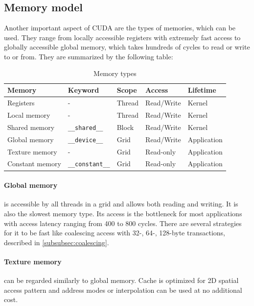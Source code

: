 \subsection{Memory model}\label{subsec:memory}

Another important aspect of CUDA are the types of memories, which can be used. They range from locally accessible registers with extremely fast access to globally accessible global memory, which takes hundreds of cycles to read or write to or from. They are summarized by the following table:

\begin{table}
\centering
\begin{tabular}{| l | l | l | l | l |}
\hline
Memory & Keyword & Scope & Access & Lifetime \\
\hline
Registers & - & Thread & Read/Write & Kernel \\
\hline
Local memory & - & Thread & Read/Write & Kernel \\
\hline
Shared memory & \verb|__shared__| & Block & Read/Write &  Kernel \\
\hline
Global memory & \verb|__device__| & Grid & Read/Write & Application \\
\hline
Texture memory & - & Grid & Read-only & Application \\
\hline
Constant memory & \verb|__constant__| & Grid & Read-only & Application \\
\hline
\end{tabular}
\caption{Memory types}
\end{table}

\paragraph{Global memory} is accessible by all threads in a grid and allows both reading and writing. It is also the slowest memory type. Its access is the bottleneck for most applications with access latency ranging from 400 to 800 cycles. There are several strategies for it to be fast like coalescing access with 32-, 64-, 128-byte transactions, described in \ref{subsubsec:coalescing}.

\paragraph{Texture memory} can be regarded similarly to global memory. Cache is optimized for 2D spatial access pattern and address modes or interpolation can be used at no additional cost.

